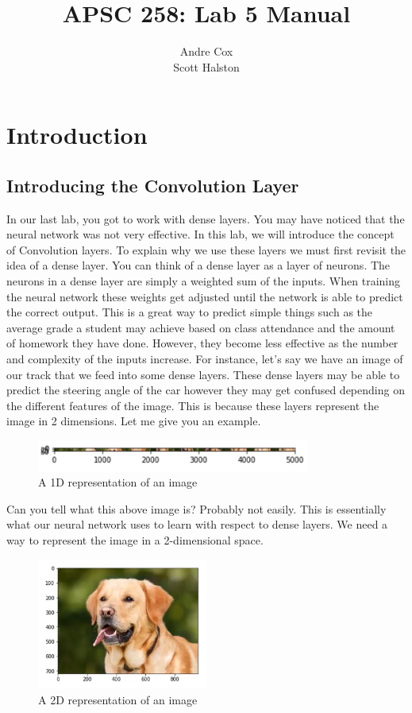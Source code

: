 \documentclass[11pt]{report}
\title{APSC 258: Lab 5 Manual}
\author{Andre Cox \\ Scott Halston}
\begin{document}
\maketitle
\tableofcontents

\clearpage

\chapter{Introduction}
\section{Introducing the Convolution Layer}
In our last lab, you got to work with dense layers. You may have noticed that the neural network was not very effective. In this lab, we will introduce the concept of Convolution layers. To explain why we use these layers we must first revisit the idea of a dense layer. You can think of a dense layer as a layer of neurons. The neurons in a dense layer are simply a weighted sum of the inputs. When training the neural network these weights get adjusted until the network is able to predict the correct output. This is a great way to predict simple things such as the average grade a student may achieve based on class attendance and the amount of homework they have done. However, they become less effective as the number and complexity of the inputs increase. For instance, let's say we have an image of our track that we feed into some dense layers. These dense layers may be able to predict the steering angle of the car however they may get confused depending on the different features of the image. This is because these layers represent the image in 2 dimensions. Let me give you an example. 

\begin{figure}[h]
\centering
\includegraphics[width=0.8\textwidth]{./images/dogdense.png}
\caption{A 1D representation of an image}
\label{fig:1d}
\end{figure}

Can you tell what this above image is? Probably not easily. This is essentially what our neural network uses to learn with respect to dense layers. We need a way to represent the image in a 2-dimensional space.

\begin{figure}[h]
\centering
\includegraphics[width=0.5\textwidth]{./images/dogconv.png}
\caption{A 2D representation of an image}
\label{fig:2d}
\end{figure}
\end{document}
